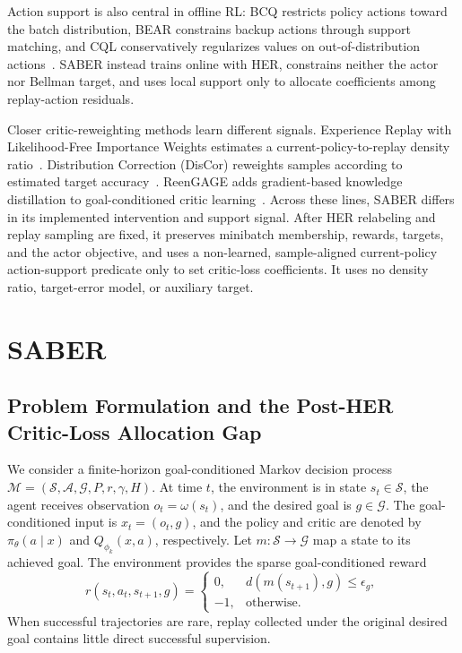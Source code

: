 \documentclass[letterpaper]{article}
\begin{document}
Action support is also central in offline RL: BCQ restricts policy actions toward the batch distribution, BEAR constrains backup actions through support matching, and CQL conservatively regularizes values on out-of-distribution actions~\citep{fujimoto2019bcq,kumar2019bear,kumar2020cql}. SABER instead trains online with HER, constrains neither the actor nor Bellman target, and uses local support only to allocate coefficients among replay-action residuals.

Closer critic-reweighting methods learn different signals. Experience Replay with Likelihood-Free Importance Weights estimates a current-policy-to-replay density ratio~\citep{sinha2022lfiw}. Distribution Correction (DisCor) reweights samples according to estimated target accuracy~\citep{kumar2020discor}. ReenGAGE adds gradient-based knowledge distillation to goal-conditioned critic learning~\citep{levine2023reengage}. Across these lines, SABER differs in its implemented intervention and support signal. After HER relabeling and replay sampling are fixed, it preserves minibatch membership, rewards, targets, and the actor objective, and uses a non-learned, sample-aligned current-policy action-support predicate only to set critic-loss coefficients. It uses no density ratio, target-error model, or auxiliary target.

\section{SABER}\label{sec:saber}

\subsection{Problem Formulation and the Post-HER Critic-Loss Allocation Gap}

We consider a finite-horizon goal-conditioned Markov decision process
\(\mathcal M=(\mathcal S,\mathcal A,\mathcal G,P,r,\gamma,H)\).
At time \(t\), the environment is in state \(s_t\in\mathcal S\), the
agent receives observation \(o_t=\omega(s_t)\), and the desired goal is
\(g\in\mathcal G\).  The goal-conditioned input is \(x_t=(o_t,g)\), and
the policy and critic are denoted by
\(\pi_\theta(a\mid x)\) and \(Q_{\phi_k}(x,a)\), respectively.  Let
\(m:\mathcal S\rightarrow\mathcal G\) map a state to its achieved goal.
The environment provides the sparse goal-conditioned reward
\begin{equation}
r(s_t,a_t,s_{t+1},g)=
\begin{cases}
0, & d\!\left(m(s_{t+1}),g\right)\leq\epsilon_g,\\
-1, & \text{otherwise}.
\end{cases}
\end{equation}
When successful trajectories are rare, replay collected under the
original desired goal contains little direct successful supervision.
\end{document}
